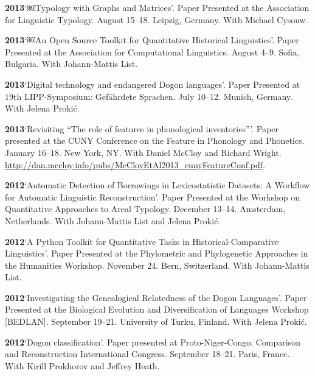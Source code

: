 \documentclass[11pt]{article}
\newcommand{\hangpara}{
 \setlength{\parindent}{0in} %
 \hangindent=0.42in %
}
\begin{document}
\vskip 6pt
\hangpara
{\bf 2013}\hspace{1ex}`￼Typology with Graphs and Matrices'. Paper Presented at the Association for Linguistic Typology. August 15--18. Leipzig, Germany. With Michael Cysouw.

\vskip 6pt
\hangpara
{\bf 2013}\hspace{1ex}`￼An Open Source Toolkit for Quantitative Historical Linguistics'. Paper Presented at the Association for Computational Linguistics. August 4--9. Sofia, Bulgaria. With Johann-Mattis List.

\vskip 6pt
\hangpara
{\bf 2013}\hspace{1ex}`Digital technology and endangered Dogon languages'. Paper Presented at 19th LIPP-Symposium: Gef{\"a}hrdete Sprachen. July 10--12. Munich, Germany. With Jelena Proki{\'c}.

\vskip 6pt
\hangpara
{\bf 2013}\hspace{1ex}`Revisiting ``The role of features in phonological inventories'''. Paper presented at the CUNY Conference on the Feature in Phonology and Phonetics. January 16--18. New York, NY. With Daniel McCloy and Richard Wright. \url{http://dan.mccloy.info/pubs/McCloyEtAl2013_cunyFeatureConf.pdf}.

\vskip 6pt
\hangpara
{\bf 2012}\hspace{1ex}`Automatic Detection of Borrowings in Lexicostatistic Datasets: A Workflow for Automatic Linguistic Reconstruction'. Paper Presented at the Workshop on Quantitative Approaches to Areal Typology. December 13--14. Amsterdam, Netherlands. With Johann-Mattis List and Jelena Proki{\'c}.

\vskip 6pt
\hangpara
{\bf 2012}\hspace{1ex}`A Python Toolkit for Quantitative Tasks in Historical-Comparative Linguistics'. Paper Presented at the Phylometric and Phylogenetic Approaches in the Humanities Workshop. November 24. Bern, Switzerland. With Johann-Mattis List.

\vskip 6pt
\hangpara
{\bf 2012}\hspace{1ex}`Investigating the Genealogical Relatedness of the Dogon Languages'. Paper Presented at the Biological Evolution and Diversification of Languages Workshop [BEDLAN]. September 19--21. University of Turku, Finland. With Jelena Proki{\'c}.

\vskip 6pt
\hangpara
{\bf 2012}\hspace{1ex}`Dogon classification'. Paper presented at Proto-Niger-Congo: Comparison and Reconstruction International Congress. September 18--21. Paris, France. With Kirill Prokhorov and Jeffrey Heath.
\end{document}
